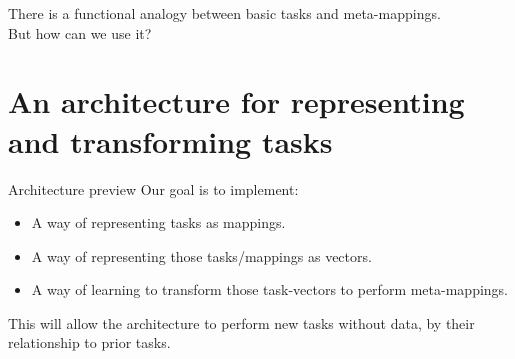 \documentclass{beamer}
\begin{document}
\begin{frame}[standout]
There is a functional analogy between basic tasks and meta-mappings. \\[1em]
But how can we use it?
\end{frame}

\section{An architecture for representing and transforming tasks}

\begin{frame}{Architecture preview}
Our goal is to implement:
\begin{itemize}
\item A way of representing tasks as mappings.
\item A way of representing those tasks/mappings as vectors.
\item A way of learning to transform those task-vectors to perform meta-mappings.
\end{itemize}
This will allow the architecture to perform new tasks without data, by their relationship to prior tasks.
\end{frame}
\end{document}

